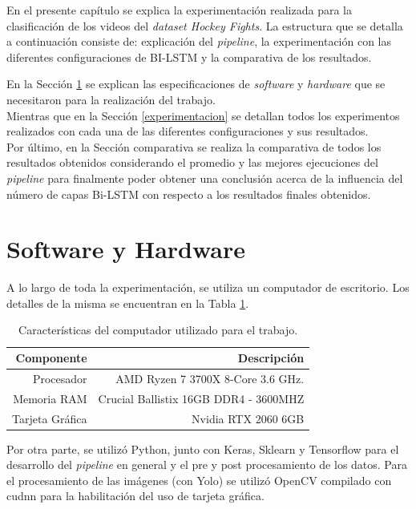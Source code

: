 En el presente capítulo se explica la experimentación 
realizada para la clasificación de los videos del 
\textit{dataset Hockey Fights}. La 
estructura que se detalla a continuación consiste de: 
explicación del \textit{pipeline}, la experimentación 
con las diferentes configuraciones de BI-LSTM y la 
comparativa de los resultados.

En la Sección \ref{software} se explican las especificaciones de 
\textit{software} y \textit{hardware} que se necesitaron para la 
realización del trabajo.\\

Mientras que en la Sección \ref{experimentacion} se detallan todos los experimentos 
realizados con cada una de las diferentes configuraciones y sus 
resultados.\\

Por último, en la Sección {comparativa} se realiza la comparativa de 
todos los resultados obtenidos considerando el promedio y las mejores 
ejecuciones del \textit{pipeline} para finalmente poder obtener una 
conclusión acerca de la influencia del número de capas Bi-LSTM con 
respecto a los resultados finales obtenidos. 

\section{Software y Hardware}\label{software}

A lo largo de toda la experimentación, se utiliza
un computador de escritorio. Los detalles de la misma se encuentran en 
la Tabla \ref{caracteristicas}.

\begin{table}[h!]
\centering
\caption{Características del computador utilizado para el trabajo.}

\begin{tabular}{|r|r|}
\hline
\textbf{Componente} & \textbf{Descripción} \\ \hline
Procesador & AMD Ryzen 7 3700X 8-Core 3.6 GHz. \\ \hline
Memoria RAM & Crucial Ballistix 16GB DDR4 - 3600MHZ \\ \hline
Tarjeta Gráfica & Nvidia RTX 2060 6GB \\ \hline
\end{tabular}
\label{caracteristicas}
\end{table}

Por otra parte, se utilizó Python, junto con Keras, Sklearn y Tensorflow 
para el desarrollo del \textit{pipeline} en general y el pre y post 
procesamiento de los datos. Para el procesamiento de las imágenes (con Yolo) 
se utilizó OpenCV compilado con cudnn para la habilitación del uso de tarjeta gráfica. 

